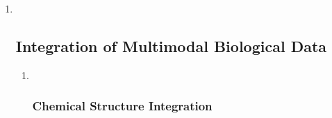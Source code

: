 \documentclass[
]{article}
\begin{document}
\begin{enumerate}
\def\labelenumi{\arabic{enumi}.}
\setcounter{enumi}{1}
\item ~
  \hypertarget{integration-of-multimodal-biological-data}{%
  \subsection{Integration of Multimodal Biological
  Data}\label{integration-of-multimodal-biological-data}}

  \begin{enumerate}
  \def\labelenumii{\arabic{enumii}.}
  \item ~
    \hypertarget{chemical-structure-integration}{%
    \subsubsection{Chemical Structure
    Integration}\label{chemical-structure-integration}}
  \end{enumerate}
\end{enumerate}
\end{document}
